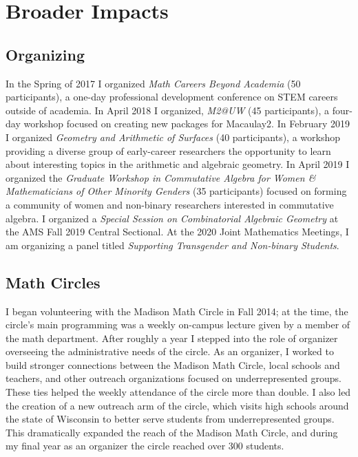 \documentclass[11pt,reqno]{amsart}
\theoremstyle{remark}
\begin{document}
\section{Broader Impacts}

\subsection{Organizing}
In the Spring of 2017 I organized \textit{Math Careers Beyond Academia } (50 participants), a one-day professional development conference on STEM careers outside of academia. In April 2018 I organized, \textit{M2@UW} (45 participants), a four-day workshop focused on creating new packages for Macaulay2. In February 2019 I organized \textit{Geometry and Arithmetic of Surfaces} (40 participants), a workshop providing a diverse group of early-career researchers the opportunity to learn about interesting topics in the arithmetic and algebraic geometry. In April 2019 I organized the \textit{Graduate Workshop in Commutative Algebra for Women \& Mathematicians of Other Minority Genders} (35 participants)  focused on forming a community of women and non-binary researchers interested in commutative algebra. I organized a \textit{Special Session on Combinatorial Algebraic Geometry} at the AMS Fall 2019 Central Sectional. At the 2020 Joint Mathematics Meetings, I am organizing a panel titled \textit{Supporting Transgender and Non-binary Students}. 

\subsection{Math Circles}
I began volunteering with the Madison Math Circle in Fall 2014; at the time, the circle's main programming was a weekly on-campus lecture given by a member of the math department. After roughly a year I stepped into the role of organizer overseeing the administrative needs of the circle. As an organizer, I worked to build stronger connections between the Madison Math Circle, local schools and teachers, and other outreach organizations focused on underrepresented groups. These ties helped the weekly attendance of the circle more than double. I also led the creation of a new outreach arm of the circle, which visits high schools around the state of Wisconsin to better serve students from underrepresented groups. This dramatically expanded the reach of the Madison Math Circle, and during my final year as an organizer the circle reached over 300 students.
\end{document}
